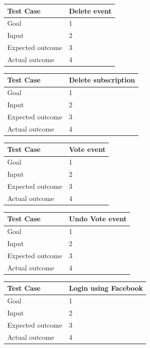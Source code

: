 \documentclass[a4paper]{scrreprt}
\begin{document}
\bigskip
\noindent
\begin{tabularx}{\linewidth}{|l|X|}
	\hline
	\textbf{Test Case} 	& \textbf{Delete event} \\ \hline
	Goal 				& 1 \\ \hline
	Input 				& 2 \\ \hline
	Expected outcome 	& 3 \\ \hline
	Actual outcome 		& 4 \\ \hline
\end{tabularx}
\bigskip
\noindent
\begin{tabularx}{\linewidth}{|l|X|}
	\hline
	\textbf{Test Case} 	& \textbf{Delete subscription} \\ \hline
	Goal 				& 1 \\ \hline
	Input 				& 2 \\ \hline
	Expected outcome 	& 3 \\ \hline
	Actual outcome 		& 4 \\ \hline
\end{tabularx}
\bigskip
\noindent
\begin{tabularx}{\linewidth}{|l|X|}
	\hline
	\textbf{Test Case} 	& \textbf{Vote event} \\ \hline
	Goal 				& 1 \\ \hline
	Input 				& 2 \\ \hline
	Expected outcome 	& 3 \\ \hline
	Actual outcome 		& 4 \\ \hline
\end{tabularx}
\bigskip
\noindent
\begin{tabularx}{\linewidth}{|l|X|}
	\hline
	\textbf{Test Case} 	& \textbf{Undo Vote event} \\ \hline
	Goal 				& 1 \\ \hline
	Input 				& 2 \\ \hline
	Expected outcome 	& 3 \\ \hline
	Actual outcome 		& 4 \\ \hline
\end{tabularx}
\bigskip
\noindent
\begin{tabularx}{\linewidth}{|l|X|}
	\hline
	\textbf{Test Case} 	& \textbf{Login using Facebook} \\ \hline
	Goal 				& 1 \\ \hline
	Input 				& 2 \\ \hline
	Expected outcome 	& 3 \\ \hline
	Actual outcome 		& 4 \\ \hline
\end{tabularx}
\end{document}
